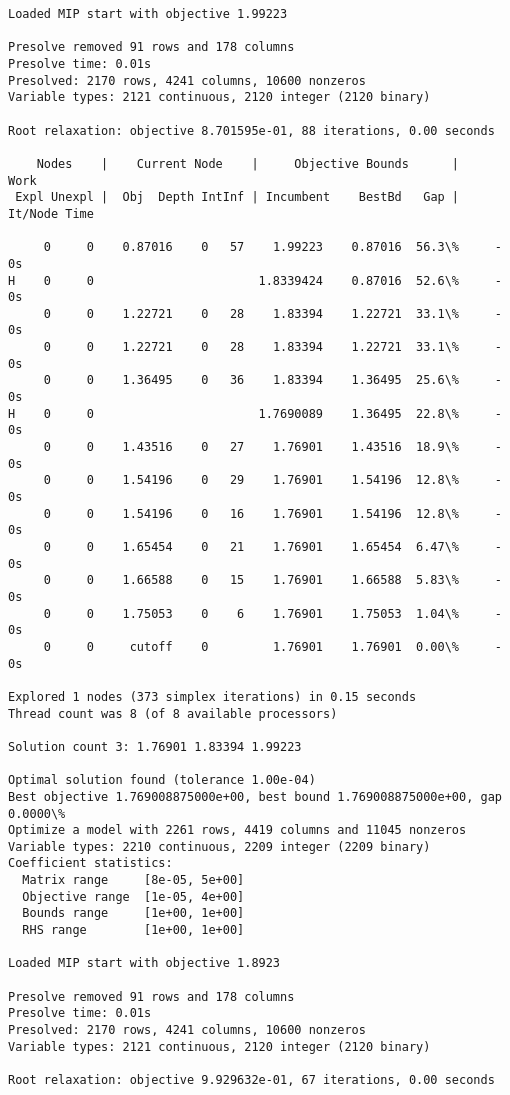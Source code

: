\documentclass[11pt]{article}
\begin{document}
\begin{Verbatim}[commandchars=\\\{\}]
Loaded MIP start with objective 1.99223

Presolve removed 91 rows and 178 columns
Presolve time: 0.01s
Presolved: 2170 rows, 4241 columns, 10600 nonzeros
Variable types: 2121 continuous, 2120 integer (2120 binary)

Root relaxation: objective 8.701595e-01, 88 iterations, 0.00 seconds

    Nodes    |    Current Node    |     Objective Bounds      |     Work
 Expl Unexpl |  Obj  Depth IntInf | Incumbent    BestBd   Gap | It/Node Time

     0     0    0.87016    0   57    1.99223    0.87016  56.3\%     -    0s
H    0     0                       1.8339424    0.87016  52.6\%     -    0s
     0     0    1.22721    0   28    1.83394    1.22721  33.1\%     -    0s
     0     0    1.22721    0   28    1.83394    1.22721  33.1\%     -    0s
     0     0    1.36495    0   36    1.83394    1.36495  25.6\%     -    0s
H    0     0                       1.7690089    1.36495  22.8\%     -    0s
     0     0    1.43516    0   27    1.76901    1.43516  18.9\%     -    0s
     0     0    1.54196    0   29    1.76901    1.54196  12.8\%     -    0s
     0     0    1.54196    0   16    1.76901    1.54196  12.8\%     -    0s
     0     0    1.65454    0   21    1.76901    1.65454  6.47\%     -    0s
     0     0    1.66588    0   15    1.76901    1.66588  5.83\%     -    0s
     0     0    1.75053    0    6    1.76901    1.75053  1.04\%     -    0s
     0     0     cutoff    0         1.76901    1.76901  0.00\%     -    0s

Explored 1 nodes (373 simplex iterations) in 0.15 seconds
Thread count was 8 (of 8 available processors)

Solution count 3: 1.76901 1.83394 1.99223 

Optimal solution found (tolerance 1.00e-04)
Best objective 1.769008875000e+00, best bound 1.769008875000e+00, gap 0.0000\%
Optimize a model with 2261 rows, 4419 columns and 11045 nonzeros
Variable types: 2210 continuous, 2209 integer (2209 binary)
Coefficient statistics:
  Matrix range     [8e-05, 5e+00]
  Objective range  [1e-05, 4e+00]
  Bounds range     [1e+00, 1e+00]
  RHS range        [1e+00, 1e+00]

Loaded MIP start with objective 1.8923

Presolve removed 91 rows and 178 columns
Presolve time: 0.01s
Presolved: 2170 rows, 4241 columns, 10600 nonzeros
Variable types: 2121 continuous, 2120 integer (2120 binary)

Root relaxation: objective 9.929632e-01, 67 iterations, 0.00 seconds


\end{Verbatim}
\end{document}
